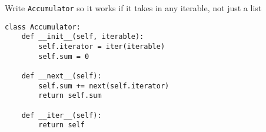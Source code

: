 \begin{blocksection}
\question Write \lstinline$Accumulator$ so it works if it takes in any
iterable, not just a list

\begin{solution}[1.5in]
\begin{lstlisting}
class Accumulator:
    def __init__(self, iterable):
        self.iterator = iter(iterable)
        self.sum = 0

    def __next__(self):
        self.sum += next(self.iterator)
        return self.sum

    def __iter__(self):
    	return self
\end{lstlisting}
\end{solution}
\end{blocksection}
